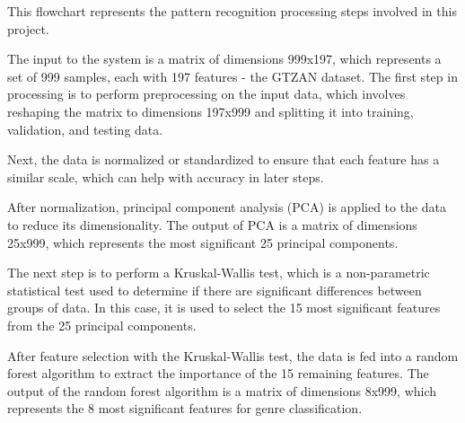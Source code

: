 \documentclass[12pt, a4paper]{article}
\begin{document}
\vspace{1cm}

This flowchart represents the pattern recognition processing steps involved in this project.

The input to the system is a matrix of dimensions 999x197, which represents a set of 999 samples, each with 197 features - the GTZAN dataset. The first step in processing is to perform preprocessing on the input data, which involves reshaping the matrix to dimensions 197x999 and splitting it into training, validation, and testing data.

Next, the data is normalized or standardized to ensure that each feature has a similar scale, which can help with accuracy in later steps.

After normalization, principal component analysis (PCA) is applied to the data to reduce its dimensionality. The output of PCA is a matrix of dimensions 25x999, which represents the most significant 25 principal components.

The next step is to perform a Kruskal-Wallis test, which is a non-parametric statistical test used to determine if there are significant differences between groups of data. In this case, it is used to select the 15 most significant features from the 25 principal components.

After feature selection with the Kruskal-Wallis test, the data is fed into a random forest algorithm to extract the importance of the 15 remaining features. The output of the random forest algorithm is a matrix of dimensions 8x999, which represents the 8 most significant features for genre classification.
\end{document}
